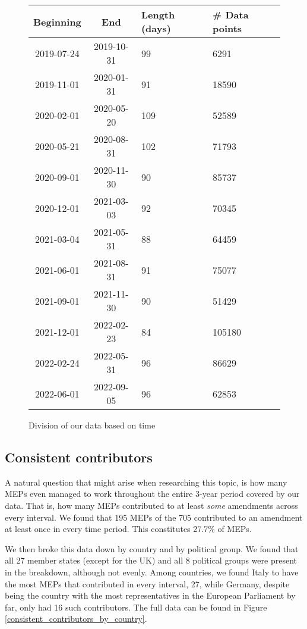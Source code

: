 \documentclass[lettersize,journal]{IEEEtran}
\begin{document}
\begin{figure}[h]
	\begin{center}
		
		\begin{tabular}{| c | c | p{1cm} | p{1cm} |}
			\hline
			Beginning & End  & Length (days) & \# Data points \\
			\hline
			2019-07-24 & 2019-10-31 & 99 & 6291 \\
			2019-11-01 & 2020-01-31 & 91 & 18590 \\
			2020-02-01 & 2020-05-20 & 109 & 52589 \\
			2020-05-21 & 2020-08-31 & 102 & 71793 \\
			2020-09-01 & 2020-11-30 & 90 & 85737 \\
			2020-12-01 & 2021-03-03 & 92 & 70345 \\
			2021-03-04 & 2021-05-31 & 88 & 64459 \\
			2021-06-01 & 2021-08-31 & 91 & 75077 \\
			2021-09-01 & 2021-11-30 & 90 & 51429 \\
			2021-12-01 & 2022-02-23 & 84 & 105180 \\
			2022-02-24 & 2022-05-31 & 96 & 86629 \\
			2022-06-01 & 2022-09-05 & 96 & 62853 \\
			\hline
		\end{tabular}
	\caption{Division of our data based on time}
	\label{tab1}
	\end{center}
\end{figure}

\subsection{Consistent contributors}

A natural question that might arise when researching this topic, is how many MEPs even managed to work throughout the entire 3-year period covered by our data. That is, how many MEPs contributed to at least \textit{some} amendments across every interval. We found that 195 MEPs of the 705 contributed to an amendment at least once in every time period. This constitutes 27.7\% of MEPs.

We then broke this data down by country and by political group. We found that all 27 member states (except for the UK) and all 8 political groups were present in the breakdown, although not evenly. Among countries, we found Italy to have the most MEPs that contributed in every interval, 27, while Germany, despite being the country with the most representatives in the European Parliament by far, only had 16 such contributors. The full data can be found in Figure \ref{consistent_contributors_by_country}.
\end{document}
